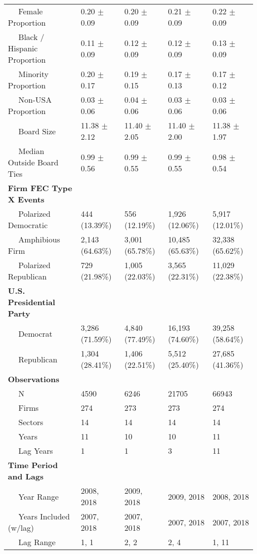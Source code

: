 \begin{tabular}{lllll}
~~ Female Proportion & 0.20 $\pm$ 0.09 & 0.20 $\pm$ 0.09 & 0.21 $\pm$ 0.09 & 0.22 $\pm$ 0.09\\
~~ Black / Hispanic Proportion & 0.11 $\pm$ 0.09 & 0.12 $\pm$ 0.09 & 0.12 $\pm$ 0.09 & 0.13 $\pm$ 0.09\\
~~ Minority Proportion & 0.20 $\pm$ 0.17 & 0.19 $\pm$ 0.15 & 0.17 $\pm$ 0.13 & 0.17 $\pm$ 0.12\\
~~ Non-USA Proportion & 0.03 $\pm$ 0.06 & 0.04 $\pm$ 0.06 & 0.03 $\pm$ 0.06 & 0.03 $\pm$ 0.06\\
\addlinespace
~~ Board Size & 11.38 $\pm$ 2.12 & 11.40 $\pm$ 2.05 & 11.40 $\pm$ 2.00 & 11.38 $\pm$ 1.97\\
~~ Median Outside Board Ties & 0.99 $\pm$ 0.56 & 0.99 $\pm$ 0.55 & 0.99 $\pm$ 0.55 & 0.98 $\pm$ 0.54\\
\bf{Firm FEC Type X Events} & ~ & ~ & ~ & ~\\
~~ Polarized Democratic & 444 (13.39\%) & 556 (12.19\%) & 1,926 (12.06\%) & 5,917 (12.01\%)\\
~~ Amphibious Firm & 2,143 (64.63\%) & 3,001 (65.78\%) & 10,485 (65.63\%) & 32,338 (65.62\%)\\
\addlinespace
~~ Polarized Republican & 729 (21.98\%) & 1,005 (22.03\%) & 3,565 (22.31\%) & 11,029 (22.38\%)\\
\bf{U.S. Presidential Party} & ~ & ~ & ~ & ~\\
~~ Democrat & 3,286 (71.59\%) & 4,840 (77.49\%) & 16,193 (74.60\%) & 39,258 (58.64\%)\\
~~ Republican & 1,304 (28.41\%) & 1,406 (22.51\%) & 5,512 (25.40\%) & 27,685 (41.36\%)\\
\bf{Observations} & ~ & ~ & ~ & ~\\
\addlinespace
~~ N & 4590 & 6246 & 21705 & 66943\\
~~ Firms & 274 & 273 & 273 & 274\\
~~ Sectors & 14 & 14 & 14 & 14\\
~~ Years & 11 & 10 & 10 & 11\\
~~ Lag Years & 1 & 1 & 3 & 11\\
\addlinespace
\bf{Time Period and Lags} & ~ & ~ & ~ & ~\\
~~ Year Range & 2008, 2018 & 2009, 2018 & 2009, 2018 & 2008, 2018\\
~~ Years Included (w/lag) & 2007, 2018 & 2007, 2018 & 2007, 2018 & 2007, 2018\\
~~ Lag Range & 1, 1 & 2, 2 & 2, 4 & 1, 11\\
\bottomrule
\end{tabular}
